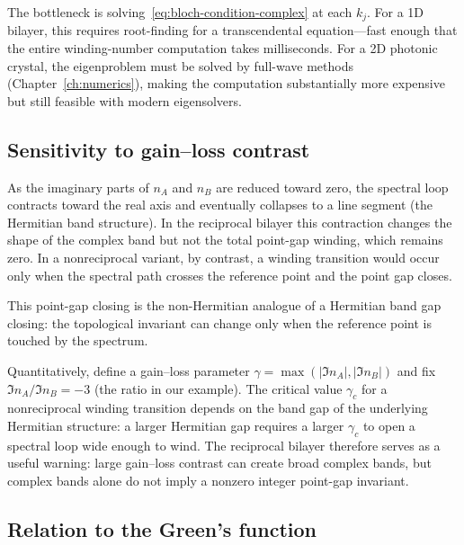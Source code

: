 \begin{booknote}
The bottleneck is solving~\eqref{eq:bloch-condition-complex} at each
$k_j$. For a 1D bilayer, this requires root-finding for a transcendental
equation---fast enough that the entire winding-number computation takes
milliseconds. For a 2D photonic crystal, the eigenproblem must be solved
by full-wave methods (Chapter~\ref{ch:numerics}), making the computation
substantially more expensive but still feasible with modern eigensolvers.
\end{booknote}

\subsection{Sensitivity to gain--loss contrast}
\label{ssec:bilayer-sensitivity}

As the imaginary parts of $n_A$ and $n_B$ are reduced toward zero, the
spectral loop contracts toward the real axis and eventually collapses to
a line segment (the Hermitian band structure). In the reciprocal
bilayer this contraction changes the shape of the complex band but not
the total point-gap winding, which remains zero. In a nonreciprocal
variant, by contrast, a winding transition would occur only when the
spectral path crosses the reference point and the point gap closes.

This point-gap closing is the non-Hermitian analogue of a Hermitian band
gap closing: the topological invariant can change only when the
reference point is touched by the spectrum.

Quantitatively, define a gain--loss parameter
$\gamma = \max(|\Im n_A|, |\Im n_B|)$ and fix
$\Im n_A/\Im n_B = -3$ (the ratio in our example). The critical
value $\gamma_c$ for a nonreciprocal winding transition depends on the
band gap of the underlying Hermitian structure: a larger Hermitian gap
requires a larger $\gamma_c$ to open a spectral loop wide enough to
wind. The reciprocal bilayer therefore serves as a useful warning:
large gain--loss contrast can create broad complex bands, but complex
bands alone do not imply a nonzero integer point-gap invariant.

\subsection{Relation to the Green's function}
\label{ssec:green-winding}

